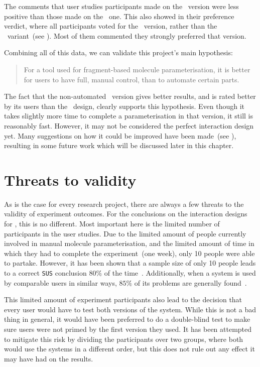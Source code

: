 The comments that user studies participants made on the \IDb\ version were less positive than those made on the \IDa\ one. This also showed in their preference verdict, where all participants voted for the \IDa\ version, rather than the \IDb\ variant~(see ). Most of them commented they strongly preferred that version.

Combining all of this data, we can validate this project's main hypothesis:
\begin{quote}
For a tool used for fragment-based molecule parameterisation, it is better for users to have full, manual control, than to automate certain parts.
\end{quote}
The fact that the non-automated \IDa\ version gives better results, and is rated better by its users than the \IDb\ design, clearly supports this hypothesis. Even though it takes slightly more time to complete a parameterisation in that version, it still is reasonably fast. However, it may not be considered the perfect interaction design yet. Many suggestions on how it could be improved have been made~(see ), resulting in some future work which will be discussed later in this chapter.



\section{Threats to validity}
As is the case for every research project, there are always a few threats to the validity of experiment outcomes. For the conclusions on the interaction designs for \oframp, this is no different. Most important here is the limited number of participants in the user studies. Due to the limited amount of people currently involved in manual molecule parameterisation, and the limited amount of time in which they had to complete the experiment~(one week), only 10 people were able to partake. However, it has been shown that a sample size of only 10 people leads to a correct \verb|SUS| conclusion $80\%$ of the time~\cite{tullis2004comparison}. Additionally, when a system is used by comparable users in similar ways, $85\%$ of its problems are generally found~\cite{nielsen2000you}.

This limited amount of experiment participants also lead to the decision that every user would have to test both versions of the system. While this is not a bad thing in general, it would have been preferred to do a double-blind test to make sure users were not primed by the first version they used. It has been attempted to mitigate this risk by dividing the participants over two groups, where both would use the systems in a different order, but this does not rule out any effect it may have had on the results.


